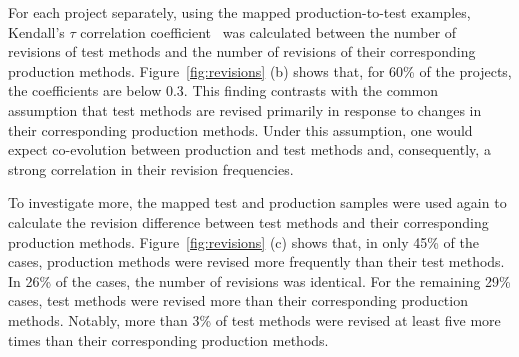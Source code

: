 For each project separately, using the mapped production-to-test examples, Kendall's $\tau$ correlation coefficient~\cite{Inozemtseva:2014} was calculated between the number of revisions of test methods and the number of revisions of their corresponding production methods. Figure~\ref{fig:revisions} (b) shows that, for 60\% of the projects, the coefficients are below 0.3. This finding contrasts with the common assumption that test methods are revised primarily in response to changes in their corresponding production methods. Under this assumption, one would expect co-evolution between production and test methods and, consequently, a strong correlation in their revision frequencies.

To investigate more, the mapped test and production samples were used again to calculate the revision difference between test methods and their corresponding production methods. Figure~\ref{fig:revisions} (c) shows that, in only 45\% of the cases, production methods were revised more frequently than their test methods. In 26\% of the cases, the number of revisions was identical. For the remaining 29\% cases, test methods were revised more than their corresponding production methods. Notably, more than 3\% of test methods were revised at least five more times than their corresponding production methods.




